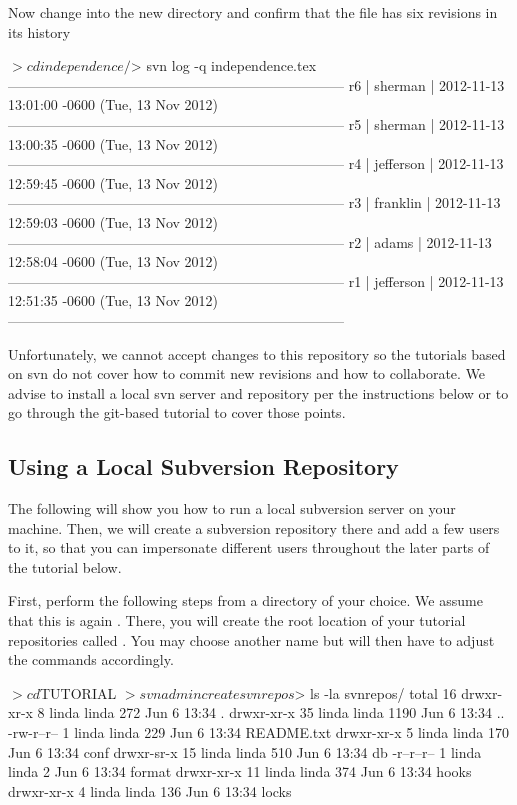 Now change into the new directory and confirm that the file has six revisions in its history
\begin{CodeVerbatim}
$> cd independence/
$> svn log -q independence.tex 
------------------------------------------------------------------------
r6 | sherman | 2012-11-13 13:01:00 -0600 (Tue, 13 Nov 2012)
------------------------------------------------------------------------
r5 | sherman | 2012-11-13 13:00:35 -0600 (Tue, 13 Nov 2012)
------------------------------------------------------------------------
r4 | jefferson | 2012-11-13 12:59:45 -0600 (Tue, 13 Nov 2012)
------------------------------------------------------------------------
r3 | franklin | 2012-11-13 12:59:03 -0600 (Tue, 13 Nov 2012)
------------------------------------------------------------------------
r2 | adams | 2012-11-13 12:58:04 -0600 (Tue, 13 Nov 2012)
------------------------------------------------------------------------
r1 | jefferson | 2012-11-13 12:51:35 -0600 (Tue, 13 Nov 2012)
------------------------------------------------------------------------
\end{CodeVerbatim}

Unfortunately, we cannot accept changes to this repository so the tutorials based on svn do not cover how to commit new revisions and how to collaborate.  We advise to install a local svn server and repository per the instructions below or to go through the git-based tutorial to cover those points.

\subsection{Using a Local Subversion Repository} \label{sec:example-svn-local}

The following will show you how to run a local subversion server on your machine.  Then, we will create a subversion repository there and add a few users to it, so that you can impersonate different users throughout the later parts of the tutorial below.

First, perform the following steps from a directory of your choice.  We assume that this is again .  There, you will create the root location of your tutorial repositories called .  You may choose another name but will then have to adjust the commands accordingly.
\begin{CodeVerbatim}
$> cd $TUTORIAL
$> svnadmin create svnrepos
$> ls -la svnrepos/
total 16
drwxr-xr-x   8 linda  linda   272 Jun  6 13:34 .
drwxr-xr-x  35 linda  linda  1190 Jun  6 13:34 ..
-rw-r--r--   1 linda  linda   229 Jun  6 13:34 README.txt
drwxr-xr-x   5 linda  linda   170 Jun  6 13:34 conf
drwxr-sr-x  15 linda  linda   510 Jun  6 13:34 db
-r--r--r--   1 linda  linda     2 Jun  6 13:34 format
drwxr-xr-x  11 linda  linda   374 Jun  6 13:34 hooks
drwxr-xr-x   4 linda  linda   136 Jun  6 13:34 locks
\end{CodeVerbatim}


